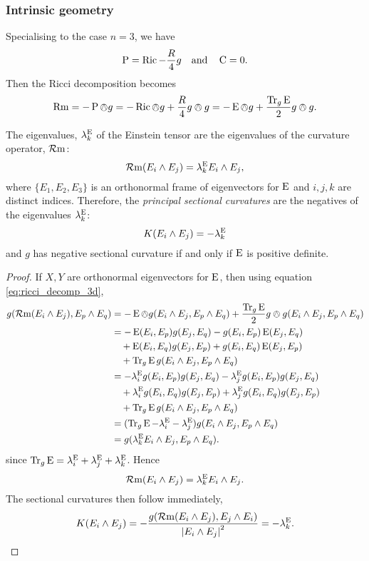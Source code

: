 \documentclass[a4paper, 12pt]{amsart}
\begin{document}
\subsubsection{Intrinsic geometry}
Specialising to the case \(n = 3\), we have
\[
\operatorname{P} = \operatorname{Ric} - \frac{R}{4} g \quad \text{and} \quad \operatorname{C} = 0.
\]
Then the Ricci decomposition becomes
\begin{equation}
\label{eq:ricci_decomp_3d}
\operatorname{Rm} = -\operatorname{P} \owedge g = -\operatorname{Ric} \owedge g + \frac{R}{4} g \owedge g = -\operatorname{E} \owedge g + \frac{\operatorname{Tr}_g \operatorname{E}}{2} g \owedge g.
\end{equation}
\begin{lemma}
\label{lem:eins_sectional}
The eigenvalues, \(\lambda^{\operatorname{E}}_k\) of the Einstein tensor are the eigenvalues of the curvature operator, \(\operatorname{\mathcal{R}m}\):
\[
\operatorname{\mathcal{R}m}(E_i \wedge E_j) = \lambda^{\operatorname{E}}_k E_i \wedge E_j
,\]
where \(\{E_1, E_2, E_3\}\) is an orthonormal frame of eigenvectors for \(\operatorname{E}\) and \(i,j,k\) are distinct indices. Therefore, the \emph{principal sectional curvatures} are the negatives of the eigenvalues \(\lambda^{\operatorname{E}}_k\):
\[
K(E_i \wedge E_j) = -\lambda^{\operatorname{E}}_k
\]
and \(g\) has negative sectional curvature if and only if \(\operatorname{E}\) is positive definite.
\end{lemma}
\begin{proof}
If \(X, Y\) are orthonormal eigenvectors for \(\operatorname{E}\), then using equation \eqref{eq:ricci_decomp_3d},
\[
\begin{split}
g(\operatorname{\mathcal{R}m}(E_i \wedge E_j), E_p \wedge E_q) &= -\operatorname{E} \owedge g (E_i \wedge E_j, E_p \wedge E_q) + \frac{\operatorname{Tr}_g \operatorname{E}}{2} g \owedge g (E_i \wedge E_j, E_p \wedge E_q) \\
&= - \operatorname{E}(E_i, E_p) g(E_j, E_q) - g(E_i, E_p) \operatorname{E}(E_j, E_q) \\
&\quad + \operatorname{E}(E_i, E_q) g(E_j, E_p) + g(E_i, E_q) \operatorname{E}(E_j, E_p) \\
&\quad + \operatorname{Tr}_g \operatorname{E} g(E_i \wedge E_j, E_p \wedge E_q) \\
&= - \lambda^{\operatorname{E}}_i g(E_i, E_p) g(E_j, E_q) - \lambda^{\operatorname{E}}_j g(E_i, E_p) g(E_j, E_q) \\
&\quad + \lambda^{\operatorname{E}}_i g(E_i, E_q) g(E_j, E_p) + \lambda^{\operatorname{E}}_j g(E_i, E_q) g(E_j, E_p) \\
&\quad + \operatorname{Tr}_g \operatorname{E} g(E_i \wedge E_j, E_p \wedge E_q) \\
&= (\operatorname{Tr}_g \operatorname{E} - \lambda^{\operatorname{E}}_i - \lambda^{\operatorname{E}}_j) g(E_i \wedge E_j, E_p \wedge E_q) \\
&= g(\lambda^{\operatorname{E}}_k E_i \wedge E_j, E_p \wedge E_q).
\end{split}
\]
since \(\operatorname{Tr}_g \operatorname{E} = \lambda^{\operatorname{E}}_i + \lambda^{\operatorname{E}}_j + \lambda^{\operatorname{E}}_k\). Hence
\[
\operatorname{\mathcal{R}m}(E_i \wedge E_j) = \lambda^{\operatorname{E}}_k E_i \wedge E_j.
\]
The sectional curvatures then follow immediately,
\[
K (E_i \wedge E_j) = -\frac{g(\operatorname{\mathcal{R}m}(E_i \wedge E_j), E_j \wedge E_i)}{\left\lvert{E_i \wedge E_j}\right\rvert^2} = -\lambda^{\operatorname{E}}_k.
\]
\end{proof}
\end{document}
